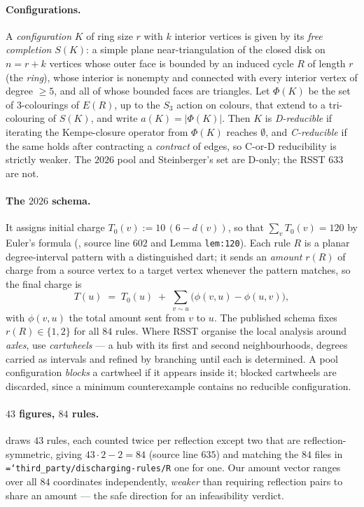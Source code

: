 \documentclass[11pt]{article}
\theoremstyle{definition}
\newcommand{\art}[1]{{\texttt{\hyphenchar\font=`\-\relax #1}}}
\begin{document}
\paragraph{Configurations.} A \emph{configuration} $K$ of ring size $r$ with $k$
interior vertices is given by its \emph{free completion} $S(K)$: a simple plane
near-triangulation of the closed disk on $n = r+k$ vertices whose outer face is
bounded by an induced cycle $R$ of length $r$ (the \emph{ring}), whose interior
is nonempty and connected with every interior vertex of degree $\ge5$, and all of
whose bounded faces are triangles. Let $\Phi(K)$ be the set of $3$-colourings of
$E(R)$, up to the $S_3$ action on colours, that extend to a tri-colouring of
$S(K)$, and write $a(K) = |\Phi(K)|$. Then $K$ is \emph{D-reducible} if iterating the
Kempe-closure operator from $\Phi(K)$ reaches $\emptyset$, and \emph{C-reducible}
if the same holds after contracting a \emph{contract} of edges, so C-or-D
reducibility is strictly weaker. The $2026$ pool \cite{nl4ct2026} and
Steinberger's set \cite{steinberger2010} are D-only; the RSST $633$ are not.

\paragraph{The $2026$ schema.} It assigns initial charge $T_0(v) := 10\,(6-d(v))$,
so that $\sum_v T_0(v) = 120$ by Euler's formula (\cite{nl4ct2026}, source line
$602$ and Lemma \texttt{lem:120}). Each rule $R$ is a planar degree-interval
pattern with a distinguished dart; it sends an \emph{amount} $r(R)$ of charge
from a source vertex to a target vertex whenever the pattern matches, so the
final charge is
\begin{equation}
\label{eq:finalcharge}
  T(u) \;=\; T_0(u) \;+\; \sum_{v \sim u}\bigl(\phi(v,u) - \phi(u,v)\bigr),
\end{equation}
with $\phi(v,u)$ the total amount sent from $v$ to $u$. The published schema fixes
$r(R) \in \{1,2\}$ for all $84$ rules. Where RSST \cite{rsst-discharge} organise
the local analysis around \emph{axles}, \cite{steinberger2010,nl4ct2026} use
\emph{cartwheels} --- a hub with its first and second neighbourhoods, degrees
carried as intervals and refined by branching until each is determined. A pool
configuration \emph{blocks} a cartwheel if it appears inside it; blocked
cartwheels are discarded, since a minimum counterexample contains no reducible
configuration.

\paragraph{$43$ figures, $84$ rules.} \cite{nl4ct2026} draws $43$ rules, each
counted twice per reflection except two that are reflection-symmetric, giving
$43\cdot 2 - 2 = 84$ (source line $635$) and matching the $84$ files in
\art{third\_party/discharging-rules/R} one for one. Our amount vector ranges over
all $84$ coordinates independently, \emph{weaker} than requiring reflection pairs
to share an amount --- the safe direction for an infeasibility verdict.
\end{document}
